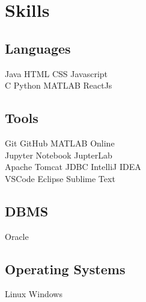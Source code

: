 \documentclass[]{deedy-resume-openfont}
\begin{document}
%
%

%
%

%
%

\begin{minipage}[t]{0.33\textwidth} 


\section{Skills}
\subsection{Languages}
Java \textbullet{} HTML \textbullet{} CSS \textbullet{} Javascript \\
\textbullet{} C  \textbullet{} Python \textbullet{} MATLAB \textbullet{} ReactJs




\subsection{Tools}
Git \textbullet{} GitHub  \textbullet{} MATLAB Online  \textbullet{} \\ Jupyter Notebook \textbullet{} JupterLab \\ \textbullet{} Apache Tomcat   \textbullet{} JDBC \textbullet{} IntelliJ IDEA \\ \textbullet{} VSCode  \textbullet{} Eclipse \textbullet{} Sublime Text
\sectionsep

\subsection{DBMS}
Oracle  
\sectionsep

\subsection{Operating Systems}
Linux \textbullet{} Windows 
\sectionsep


\end{minipage}
\end{document}
